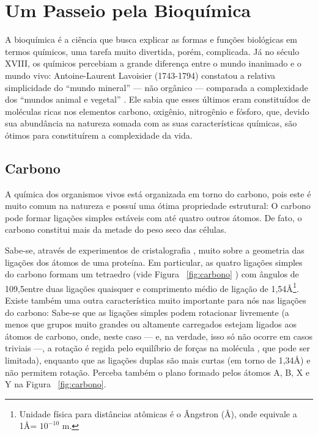 \documentclass[a4paper,12pt]{article}
\begin{document}
	\newpage
	
	\section{Um Passeio pela Bioquímica}
	A bioquímica é a ciência que busca explicar as formas e funções biológicas em termos químicos, uma tarefa muito divertida, porém, complicada. Já no século XVIII, os químicos percebiam a grande diferença entre o mundo inanimado e o mundo vivo: Antoine-Laurent Lavoisier (1743-1794) constatou a relativa simplicidade do ``mundo mineral'' --- não orgânico --- comparada a complexidade dos ``mundos animal e vegetal'' \cite{bioquimicaLehninger}. Ele sabia que esses últimos eram constituídos de moléculas ricas nos elementos carbono, oxigênio, nitrogênio e fósforo, que, devido sua abundância na natureza somada com as suas características químicas, são ótimos para constituírem a complexidade da vida.

	\subsection{Carbono}
	A química dos organismos vivos está organizada em torno do carbono, pois este é muito comum na natureza e possuí uma ótima propriedade estrutural: O carbono pode formar ligações simples estáveis com até quatro outros átomos. De fato, o carbono constitui mais da metade do peso seco das células. 
	
	Sabe-se, através de experimentos de cristalografia \cite{ramachandran1974MolStructure}, muito sobre a geometria das ligações dos átomos de uma proteína. Em particular, as quatro ligações simples do carbono formam um tetraedro (vide Figura ~\ref{fig:carbono} \cite{bioquimicaLehninger}) com ângulos de 109,5\textdegree entre duas ligações quaisquer e comprimento médio de ligação de 1,54\AA\footnote[1]{Unidade física para distâncias atômicas é o Ângstron (\AA), onde equivale a 1\AA = $10^{-10}$ m.}. Existe também uma outra característica muito importante para nós nas ligações do carbono: Sabe-se que as ligações simples podem rotacionar livremente (a menos que grupos muito grandes ou altamente carregados estejam ligados aos átomos de carbono, onde, neste caso --- e, na verdade, isso só não ocorre em casos triviais ---, a rotação é regida pelo equilíbrio de forças na molécula \cite{carlileTese}, que pode ser limitada), enquanto que as ligações duplas são mais curtas (em torno de 1,34\AA) e não permitem rotação. Perceba também o plano formado pelos átomos A, B, X e Y na Figura ~\ref{fig:carbono}.
\end{document}
